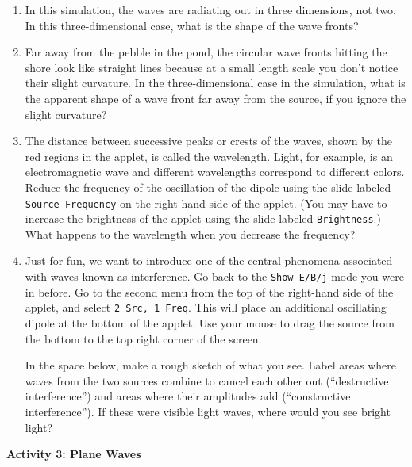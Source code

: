 \begin{enumerate}[labparts]

\item In this simulation, the waves are radiating out in three dimensions, not two.  In this three-dimensional case, what is the shape of the wave fronts?
\answerspace{1cm}

\item Far away from the pebble in the pond, the circular wave fronts hitting the shore look like straight lines because at a small length scale you don't notice their slight curvature. 
In the three-dimensional case in the simulation, what is the apparent shape of a wave front far away from the source, if you ignore the slight curvature?
\answerspace{1cm}


\pagebreak[2]
\item The distance between successive peaks or crests of the waves, shown by the red regions in the
applet, is called the wavelength.  
Light, for example, is an electromagnetic wave and different wavelengths correspond 
to different colors.
Reduce the frequency of the oscillation of the dipole using the slide labeled
\texttt{Source Frequency} on the right-hand side of the applet.
(You may have to increase the brightness of the applet using the slide labeled
\texttt{Brightness}.)
What happens to the wavelength when you decrease the frequency?
\answerspace{1.0cm}


\item Just for fun, we want to introduce one of the central phenomena associated
with waves known as interference.
Go back to the \texttt{Show E/B/j} mode you were in before. 
Go to the second menu from the top of the right-hand side of the applet, and select
\texttt{2 Src, 1 Freq}.
This will place an additional oscillating dipole at the bottom of the applet.  Use your mouse to drag the source from the bottom to the top right corner of the screen.

In the space below, make a rough sketch of what you see.  Label areas where waves from the two sources combine to cancel each other out (``destructive interference'') and areas where their amplitudes add (``constructive interference'').  If these were visible light waves, where would you see bright light?
\vfill

\end{enumerate}

\textbf{Activity 3: Plane Waves}


